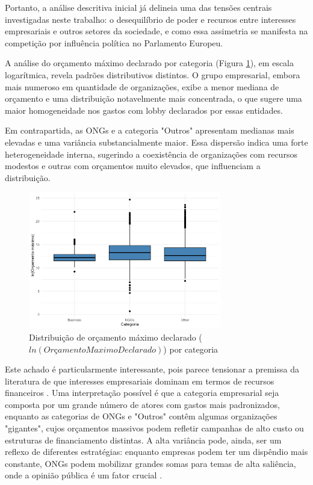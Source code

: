 Portanto, a análise descritiva inicial já delineia uma das tensões centrais investigadas neste trabalho: o desequilíbrio de poder e recursos entre interesses empresariais e outros setores da sociedade, e como essa assimetria se manifesta na competição por influência política no Parlamento Europeu.


A análise do orçamento máximo declarado por categoria (Figura \ref{fig:budget_ln_boxplot}), em escala logarítmica, revela padrões distributivos distintos. O grupo empresarial, embora mais numeroso em quantidade de organizações, exibe a menor mediana de orçamento e uma distribuição notavelmente mais concentrada, o que sugere uma maior homogeneidade nos gastos com lobby declarados por essas entidades.

Em contrapartida, as ONGs e a categoria "Outros" apresentam medianas mais elevadas e uma variância substancialmente maior. Essa dispersão indica uma forte heterogeneidade interna, sugerindo a coexistência de organizações com recursos modestos e outras com orçamentos muito elevados, que influenciam a distribuição.

\begin{figure}[!htbp]
\centering
\includegraphics[width=0.75\textwidth]{figures/descriptives_lobbyists/boxplot_max_budget_by_category.png}
\caption{Distribuição de orçamento máximo declarado ($ln(Orçamento Maximo Declarado)$) por categoria}
\label{fig:budget_ln_boxplot}
\end{figure}

Este achado é particularmente interessante, pois parece tensionar a premissa da literatura de que interesses empresariais dominam em termos de recursos financeiros \cite{de_figueiredo_advancing_2014, dur20212wholobbies}. Uma interpretação possível é que a categoria empresarial seja composta por um grande número de atores com gastos mais padronizados, enquanto as categorias de ONGs e "Outros" contêm algumas organizações "gigantes", cujos orçamentos massivos podem refletir campanhas de alto custo ou estruturas de financiamento distintas. A alta variância pode, ainda, ser um reflexo de diferentes estratégias: enquanto empresas podem ter um dispêndio mais constante, ONGs podem mobilizar grandes somas para temas de alta saliência, onde a opinião pública é um fator crucial \cite{mahoney_lobbying_2007}.

